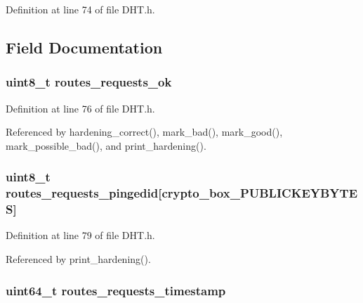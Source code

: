 Definition at line 74 of file D\+H\+T.\+h.



\subsection{Field Documentation}
\hypertarget{struct_hardening_a3bc4c156861571ceca55275d95f6221b}{
\subsubsection[{routes\+\_\+requests\+\_\+ok}]{\setlength{\rightskip}{0pt plus 5cm}uint8\+\_\+t routes\+\_\+requests\+\_\+ok}}\label{struct_hardening_a3bc4c156861571ceca55275d95f6221b}


Definition at line 76 of file D\+H\+T.\+h.



Referenced by hardening\+\_\+correct(), mark\+\_\+bad(), mark\+\_\+good(), mark\+\_\+possible\+\_\+bad(), and print\+\_\+hardening().

\hypertarget{struct_hardening_aee791c81812d61023e3ecc7ebc33f4c0}{
\subsubsection[{routes\+\_\+requests\+\_\+pingedid}]{\setlength{\rightskip}{0pt plus 5cm}uint8\+\_\+t routes\+\_\+requests\+\_\+pingedid\mbox{[}crypto\+\_\+box\+\_\+\+P\+U\+B\+L\+I\+C\+K\+E\+Y\+B\+Y\+T\+E\+S\mbox{]}}}\label{struct_hardening_aee791c81812d61023e3ecc7ebc33f4c0}


Definition at line 79 of file D\+H\+T.\+h.



Referenced by print\+\_\+hardening().

\hypertarget{struct_hardening_a55d6293fa06a8c4aa24e70706409b060}{
\subsubsection[{routes\+\_\+requests\+\_\+timestamp}]{\setlength{\rightskip}{0pt plus 5cm}uint64\+\_\+t routes\+\_\+requests\+\_\+timestamp}}\label{struct_hardening_a55d6293fa06a8c4aa24e70706409b060}



